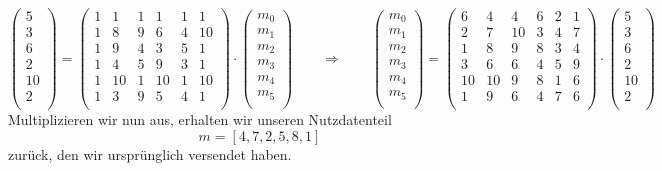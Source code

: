 \[
\begin{pmatrix}
	5 \\ 3 \\ 6 \\ 2 \\ 10 \\ 2 \\
\end{pmatrix}
=
\begin{pmatrix}
	1&  1& 1&  1& 1&  1\\
	1&  8& 9&  6& 4& 10\\
	1&  9& 4&  3& 5&  1\\
	1&  4& 5&  9& 3&  1\\
	1& 10& 1& 10& 1& 10\\
	1&  3& 9&  5& 4&  1\\
\end{pmatrix}
\cdot
\begin{pmatrix}
	m_0 \\ m_1 \\ m_2 \\ m_3 \\ m_4 \\ m_5 \\
\end{pmatrix}
\qquad
\Rightarrow
\qquad
\begin{pmatrix}
	m_0 \\ m_1 \\ m_2 \\ m_3 \\ m_4 \\ m_5 \\
\end{pmatrix}
=
\begin{pmatrix}
	6&  4&  4&  6& 2&  1\\
	2&  7& 10&  3& 4&  7\\
	1&  8&  9&  8& 3&  4\\
	3&  6&  6&  4& 5&  9\\
	10& 10&  9&  8& 1&  6\\
	1&  9&  6&  4& 7&  6\\
\end{pmatrix}
\cdot
\begin{pmatrix}
	5 \\ 3 \\ 6 \\ 2 \\ 10 \\ 2 \\
\end{pmatrix}
\]
Multiplizieren wir nun aus, erhalten wir unseren Nutzdatenteil
\[
m = [4,7,2,5,8,1]
\]
zurück, den wir ursprünglich versendet haben.

